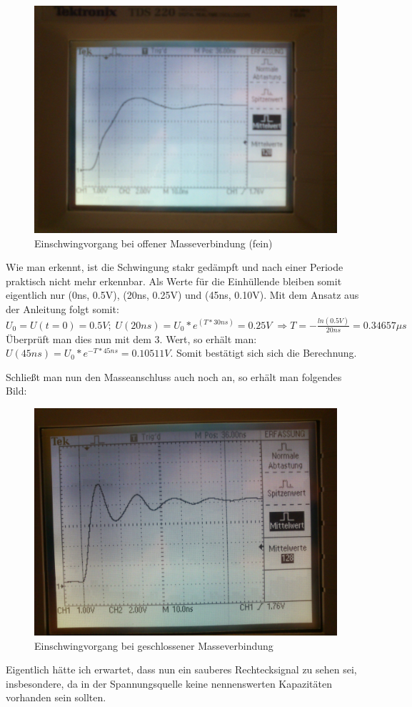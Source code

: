 \begin{figure}[H]
	\centering
	\includegraphics[width=\linewidth]{versuch4/oszi/DSC_0342.JPG}
	\caption{Einschwingvorgang bei offener Masseverbindung (fein)}
\end{figure}
Wie man erkennt, ist die Schwingung stakr gedämpft und nach einer Periode praktisch nicht mehr erkennbar. Als Werte für die Einhüllende bleiben somit eigentlich nur (0ns, 0.5V), (20ns, 0.25V) und (45ns, 0.10V). Mit dem Ansatz aus der Anleitung folgt somit:\\
$U_0=U(t=0)=0.5V;\; U(20ns)=U_0*e^(T*30ns)=0.25V\; \Rightarrow T=-\frac{ln(0.5V)}{20ns}=0.34657\mu s$\\
Überprüft man dies nun mit dem 3. Wert, so erhält man:\\
$ U(45ns)=U_0*e^{-T*45ns}=0.10511V $. Somit bestätigt sich sich die Berechnung.

Schließt man nun den Masseanschluss auch noch an, so erhält man folgendes Bild:
\begin{figure}[H]
	\centering
	\includegraphics[width=\linewidth]{versuch4/oszi/DSC_0344.JPG}
	\caption{Einschwingvorgang bei geschlossener Masseverbindung}
\end{figure}
Eigentlich hätte ich erwartet, dass nun ein sauberes Rechtecksignal zu sehen sei, insbesondere, da in der Spannungsquelle keine nennenswerten Kapazitäten vorhanden sein sollten.


